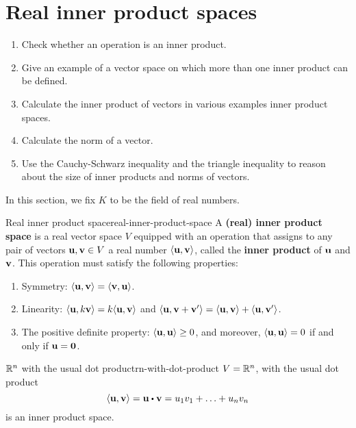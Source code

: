 \section{Real inner product spaces}

\begin{outcome}
  \begin{enumerate}
  \item Check whether an operation is an inner product.
  \item Give an example of a vector space on which more than one inner
    product can be defined.
  \item Calculate the inner product of vectors in various examples
    inner product spaces.
  \item Calculate the norm of a vector.
  \item Use the Cauchy-Schwarz inequality and the triangle inequality
    to reason about the size of inner products and norms of vectors. 
  \end{enumerate}
\end{outcome}

In this section, we fix $K$ to be the field of real numbers.

\begin{definition}{Real inner product space}{real-inner-product-space}
  A \textbf{(real) inner product space}%
   is a real vector space $V$ equipped
  with an operation that assigns to any pair of vectors
  $\vect{u},\vect{v}\in V$ a real number $\iprod{\vect{u},\vect{v}}$,
  called the \textbf{inner product}%
   of $\vect{u}$ and $\vect{v}$. This
  operation must satisfy the following properties:
  \begin{enumerate}
  \item Symmetry: $\iprod{\vect{u},\vect{v}} = \iprod{\vect{v},\vect{u}}$.
  \item Linearity:
    $\iprod{\vect{u},k\vect{v}} = k\iprod{\vect{u},\vect{v}}$ and
    $\iprod{\vect{u},\vect{v}+\vect{v}'} = \iprod{\vect{u},\vect{v}} +
    \iprod{\vect{u},\vect{v}'}$.
  \item The positive definite property: $\iprod{\vect{u},\vect{u}}
    \geq 0$, and moreover, $\iprod{\vect{u},\vect{u}}=0$ if and only
    if $\vect{u} = \vect{0}$.
  \end{enumerate}
\end{definition}

\begin{example}{$\mathbb{R}^n$ with the usual dot product}{rn-with-dot-product}
  $V=\mathbb{R}^n$, with the usual dot product
  \begin{equation*}
    \iprod{\vect{u},\vect{v}} = \vect{u}\dotprod\vect{v} =
    u_1v_1 + \ldots + u_nv_n
  \end{equation*}
  is an inner product space.
\end{example}

